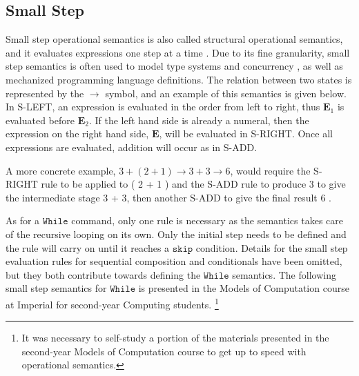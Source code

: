 \documentclass[a4paper,11pt,twoside]{report}
\begin{document}
\subsection{Small Step}
Small step operational semantics is also called structural operational semantics, and it evaluates expressions one step at a time \cite{Lecture2}. Due to its fine granularity, small step semantics is often used to model type systems and concurrency \cite{chargueraud-13-pretty}, as well as mechanized programming language definitions. The relation between two states is represented by the $\rightarrow$ symbol, and an example of this semantics is given below. In S-LEFT, an expression is evaluated in the order from left to right, thus $\mathbf{E}_1$ is evaluated before $\mathbf{E}_2$. If the left hand side is already a numeral, then the expression on the right hand side, $\mathbf{E}$, will be evaluated in S-RIGHT. Once all expressions are evaluated, addition will occur as in S-ADD.

A more concrete example, $3 + ( 2 + 1 ) \rightarrow 3 + 3 \rightarrow 6$, would require the S-RIGHT rule to be applied to ( 2 + 1 ) and the S-ADD rule to produce 3 to give the intermediate stage 3 + 3, then another S-ADD to give the final result 6 \cite{Lecture2}.

As for a $\mathtt{While}$ command, only one rule is necessary as the semantics takes care of the recursive looping on its own. Only the initial step needs to be defined and the rule will carry on until it reaches a $\mathtt{skip}$ condition. Details for the small step evaluation rules for  sequential composition and conditionals have been omitted, but they both contribute towards defining the $\mathtt{While}$ semantics. The following small step semantics for $\mathtt{While}$ is presented in the Models of Computation course at Imperial for second-year Computing students. \footnote{It was necessary to self-study a portion of the materials presented in the second-year Models of Computation course to get up to speed with operational semantics.}
\end{document}
